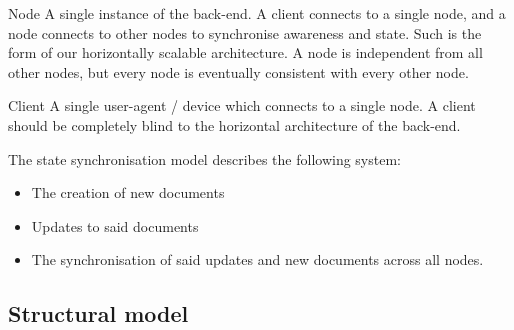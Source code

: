 \documentclass[a4paper, final]{report}
\begin{document}
\begin{definition}{Node}
	A single instance of the back-end. A client connects to a single node, and a node
	connects to other nodes to synchronise awareness and state. Such is the form
	of our horizontally scalable architecture. A node is independent from all other nodes,
	but every node is eventually consistent with every other node.
\end{definition}

\begin{definition}{Client}
	A single user-agent / device which connects to a single node. A client should be
	completely blind to the horizontal architecture of the back-end.
\end{definition}

The state synchronisation model describes the following system:

\begin{itemize}
	\item The creation of new documents
	\item Updates to said documents
	\item The synchronisation of said updates and new documents across all nodes.
\end{itemize}

\subsection{Structural model}
\end{document}
